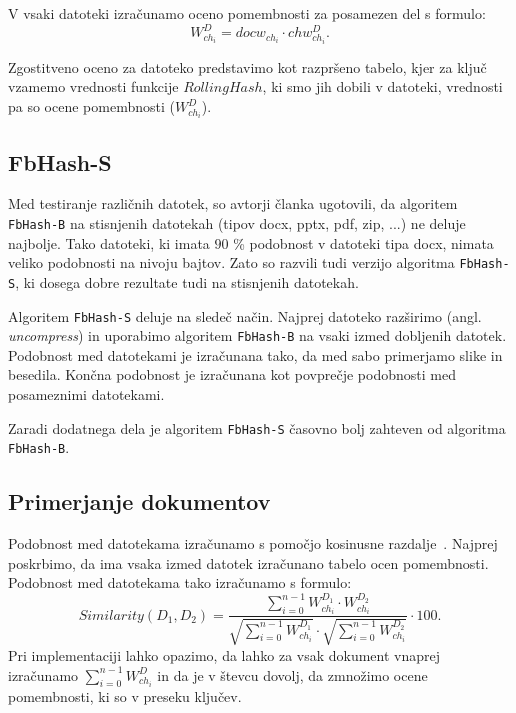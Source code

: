 \documentclass{acm_proc_article-sp}
\begin{document}
V vsaki datoteki izračunamo oceno pomembnosti za posamezen del s formulo: \begin{displaymath}  W_{ch_i}^D = docw_{ch_i} \cdot chw_{ch_i}^D. \end{displaymath}

Zgostitveno oceno za datoteko predstavimo kot razpršeno tabelo, kjer za ključ vzamemo vrednosti funkcije $RollingHash$, ki smo jih dobili v datoteki, vrednosti pa so ocene pomembnosti ($W_{ch_i}^D$).

\subsection{FbHash-S}

Med testiranje različnih datotek, so avtorji članka ugotovili, da algoritem \texttt{FbHash-B} na stisnjenih datotekah (tipov docx, pptx, pdf, zip, ...) ne deluje najbolje. Tako datoteki, ki imata $90$ \% podobnost v datoteki tipa docx, nimata veliko podobnosti na nivoju bajtov. Zato so razvili tudi verzijo algoritma \texttt{FbHash-S}, ki dosega dobre rezultate tudi na stisnjenih datotekah.

Algoritem \texttt{FbHash-S} deluje na sledeč način. Najprej datoteko razširimo (angl. \emph{uncompress}) in uporabimo algoritem \texttt{FbHash-B} na vsaki izmed dobljenih datotek. Podobnost med datotekami je izračunana tako, da med sabo primerjamo slike in besedila. Končna podobnost je izračunana kot povprečje podobnosti med posameznimi datotekami.

Zaradi dodatnega dela je algoritem \texttt{FbHash-S} časovno bolj zahteven od algoritma \texttt{FbHash-B}.

\subsection{Primerjanje dokumentov}
\label{doc-compare}

Podobnost med datotekama izračunamo s pomočjo kosinusne razdalje~\cite{Salton88term-weightingapproaches}. Najprej poskrbimo, da ima vsaka izmed datotek izračunano tabelo ocen pomembnosti. Podobnost med datotekama tako izračunamo s formulo: \begin{displaymath} Similarity(D_1, D_2)=\frac{\sum_{i=0}^{n-1} W_{ch_i}^{D_1} \cdot W_{ch_i}^{D_2}}{\sqrt{\sum_{i=0}^{n-1} W_{ch_i}^{D_1}}\cdot\sqrt{\sum_{i=0}^{n-1} W_{ch_i}^{D_2}}}\cdot 100. \end{displaymath} Pri implementaciji lahko opazimo, da lahko za vsak dokument vnaprej izračunamo $\sum_{i=0}^{n-1} W_{ch_i}^{D}$ in da je v števcu dovolj, da zmnožimo ocene pomembnosti, ki so v preseku ključev.
\end{document}
